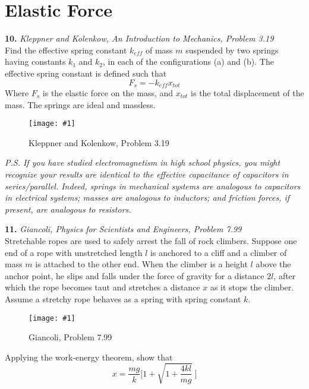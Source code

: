 \documentclass[11pt]{article}
\newcommand{\fig}[4]{
    \begin{figure}[H]
        \centering
        \texttt{[image: \#1]}
        \caption{#2}
        \label{exp4fit}
    \end{figure}
}
\theoremstyle{gangnamstyle}{\newtheorem{definition}{Definition}[]}
\theoremstyle{gangnamstyle}{\newtheorem{example}{Example}[]}
\theoremstyle{gangnamstyle}{\newtheorem{problem}{Problem}[]}
\begin{document}
\pagebreak

\section{Elastic Force}

\textbf{10.} \textit{Kleppner and Kolenkow, An Introduction to Mechanics, Problem 3.19} \\
Find the effective spring constant $k_{eff}$ of mass $m$ suspended by two springs having constants $k_1$ and $k_2$, in each of the configurations (a) and (b). The effective spring constant is defined such that
\[ F_s = -k_{eff}x_{tot} \]
Where $F_s$ is the elastic force on the mass, and $x_{tot}$ is the total displacement of the mass. The springs are ideal and massless. 
\fig{figs/0711/kk19.png}{Kleppner and Kolenkow, Problem 3.19}{0.5}{0} 
\textit{P.S. If you have studied electromagnetism in high school physics, you might recognize your results are identical to the effective capacitance of capacitors in series/parallel. Indeed, springs in mechanical systems are analogous to capacitors in electrical systems; masses are analogous to inductors; and friction forces, if present, are analogous to resistors.}

\pagebreak

\textbf{11.} \textit{Giancoli, Physics for Scientists and Engineers, Problem 7.99} \\
Stretchable ropes are used to safely arrest the fall of rock climbers. Suppose one end of a rope with unstretched length $l$ is anchored to a cliff and a climber of mass $m$ is attached to the other end. When the climber is a height $l$ above the anchor point, he slips and falls under the force of gravity for a distance $2l$, after which the rope becomes taut and stretches a distance $x$ as it stops the climber. Assume a stretchy rope behaves as a spring with spring constant $k$. 

\fig{figs/0711/giancoli99.png}{Giancoli, Problem 7.99}{0.4}{0} 

Applying the work-energy theorem, show that
\[ x = \frac{mg}{k}\Biggl[ 1 + \sqrt{1 + \frac{4kl}{mg}} \ \Biggr] \]
\end{document}
